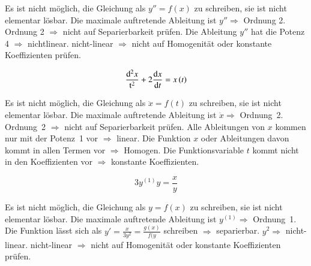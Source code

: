 \begin{outline}
    \1[a)] Es ist nicht möglich, die Gleichung als $y''=f(x)$ zu schreiben, sie
           ist nicht elementar lösbar.
    \1[b)] Die maximale auftretende Ableitung ist $y''\Rightarrow$ Ordnung 2.
        \2 Ordnung 2 $\Rightarrow$ nicht auf Separierbarkeit prüfen.
    \1[c)] Die Ableitung $y''$ hat die Potenz 4 $\Rightarrow$ nichtlinear.
        \2 nicht-linear $\Rightarrow$ nicht auf Homogenität oder konstante
           Koeffizienten prüfen.
\end{outline}

\begin{equation*}
    \frac{\mathrm{d}^2x}{ \mathrm{t} ^{2}} + 2
    \frac{\mathrm{d}x}{\mathrm{d}t} = x\left( t \right)
\end{equation*}

\begin{outline}
    \1[a)] Es ist nicht möglich, die Gleichung als $\ddot{x}=f(t)$ zu 
           schreiben, sie ist nicht elementar lösbar.
    \1[b)] Die maximale auftretende Ableitung ist $\ddot{x}\Rightarrow$ 
           Ordnung~2.
        \2 Ordnung~2 $\Rightarrow$ nicht auf Separierbarkeit prüfen.
    \1[c)] Alle Ableitungen von $x$ kommen nur mit der Potenz~1 vor
           $\Rightarrow$ linear.
        \2 Die Funktion $x$ oder Ableitungen davon kommt in allen Termen 
           vor $\Rightarrow$ Homogen.
        \2 Die Funktionsvariable $t$ kommt nicht in den Koeffizienten vor
           $\Rightarrow$ konstante Koeffizienten.
\end{outline}

\begin{equation*}
    3y^{(1)} y= \frac{x}{y}
\end{equation*}

\begin{outline}
    \1[a)] Es ist nicht möglich, die Gleichung als $y=f(x)$ zu schreiben, sie
       ist nicht elementar lösbar.
    \1[b)] Die maximale auftretende Ableitung ist $y^{(1)} \Rightarrow$ 
           Ordnung~1.
        \2 Die Funktion lässt sich als $y' = \frac{x}{3y^2}=\frac{g(x)}{f(y}$
            schreiben $\Rightarrow$ separierbar.
    \1[c)] $y^2 \Rightarrow$ nicht-linear.
        \2 nicht-linear $\Rightarrow$ nicht auf Homogenität oder konstante
           Koeffizienten prüfen.
\end{outline}
